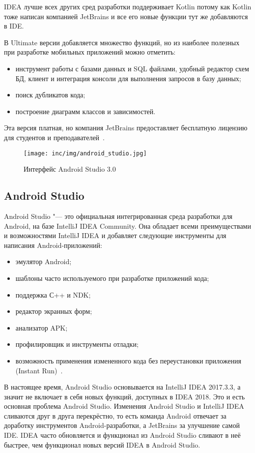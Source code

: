 IDEA лучше всех других сред разработки поддерживает Kotlin потому как Kotlin тоже написан компанией JetBrains и все его новые функции тут же добавляются в IDE\@.

В Ultimate версии добавляется множество функций, но из наиболее полезных при разработке мобильных приложений можно отметить:
\begin{itemize}
  \item инструмент работы с базами данных и SQL файлами, удобный редактор схем БД, клиент и интеграция консоли для выполнения запросов в базу данных;
  \item поиск дубликатов кода;
  \item построение диаграмм классов и зависимостей.
\end{itemize}

Эта версия платная, но компания JetBrains предоставляет бесплатную лицензию для студентов и преподавателей~\cite{jetbrains:idea}.

\begin{figure}[ht]
  \centering
  \texttt{[image: inc/img/android\_studio.jpg]}
  \caption{Интерфейс Android Studio 3.0}
  \label{fig:as}
\end{figure}

\subsection{Android Studio}
\label{subsec:as}
Android Studio "--- это официальная интегрированная среда разработки для Android, на базе IntelliJ IDEA Community.
Она обладает всеми преимуществами и возможностями IntelliJ IDEA и добавляет следующие инструменты для написания Android-приложений:
\begin{itemize}
  \item эмулятор Android;
  \item шаблоны часто используемого при разработке приложений кода;
  \item поддержка С++ и NDK;
  \item редактор экранных форм;
  \item анализатор APK;
  \item профилировщик и инструменты отладки;
  \item возможность применения измененного кода без переустановки приложения (Instant Run)~\cite{android:as}.
\end{itemize}

В настоящее время, Android Studio основывается на IntelliJ IDEA 2017.3.3, а значит не включает в себя новых функций, доступных в IDEA 2018.
Это и есть основная проблема Android Studio.
Изменения Android Studio и IntelliJ IDEA сливаются друг в друга перекрёстно, то есть команда Android отвечает за доработку инструментов Android-разработки, а JetBrains за улучшение самой IDE\@.
IDEA часто обновляется и функционал из Android Studio сливают в неё быстрее, чем функционал новых версий IDEA в Android Studio.

